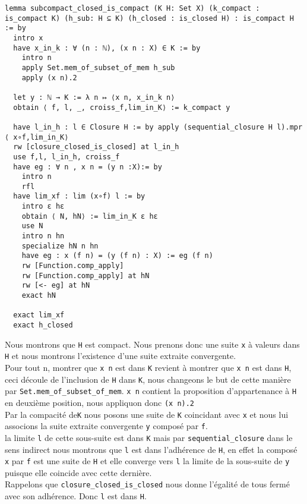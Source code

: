 \documentclass[a4paper, 12pt]{article}
\newcommand{\lean}[1]{\texttt{#1}}
\begin{document}
\begin{verbatim}
lemma subcompact_closed_is_compact (K H: Set X) (k_compact : is_compact K) (h_sub: H ⊆ K) (h_closed : is_closed H) : is_compact H := by
  intro x
  have x_in_k : ∀ (n : ℕ), (x n : X) ∈ K := by
    intro n
    apply Set.mem_of_subset_of_mem h_sub
    apply (x n).2

  let y : ℕ → K := λ n ↦ ⟨x n, x_in_k n⟩
  obtain ⟨ f, l, _, croiss_f,lim_in_K⟩ := k_compact y

  have l_in_h : l ∈ Closure H := by apply (sequential_closure H l).mpr ⟨ x∘f,lim_in_K⟩
  rw [closure_closed_is_closed] at l_in_h
  use f,l, l_in_h, croiss_f
  have eg : ∀ n , x n = (y n :X):= by
    intro n
    rfl
  have lim_xf : lim (x∘f) l := by
    intro ε hε
    obtain ⟨ N, hN⟩ := lim_in_K ε hε
    use N
    intro n hn
    specialize hN n hn
    have eg : x (f n) = (y (f n) : X) := eg (f n)
    rw [Function.comp_apply]
    rw [Function.comp_apply] at hN
    rw [<- eg] at hN
    exact hN

  exact lim_xf
  exact h_closed
\end{verbatim}

Nous montrons que \lean{H} est compact. Nous prenons donc une suite \lean{x} à valeurs dans \lean{H} et nous montrons l'existence d'une suite extraite convergente.\\

Pour tout n, montrer que \lean{x n} est dans \lean{K} revient à montrer que \lean{x n} est dans \lean{H}, ceci découle de l'inclusion de \lean{H} dans \lean{K}, nous changeons le but de cette manière par \lean{Set.mem_of_subset_of_mem}. \lean{x n} contient la proposition d'appartenance à \lean{H} en deuxième position, nous appliquon donc \lean{(x n).2}\\

Par la compacité de\lean{K} nous posons une suite de \lean{K} coincidant avec \lean{x} et nous lui associons la suite extraite convergente \lean{y} composé par \lean{f}.\\

la limite \lean{l} de cette sous-suite est dans \lean{K} mais par \lean{sequential_closure} dans le sens indirect nous montrons que \lean{l} est dans l'adhérence de \lean{H}, en effet la composé \lean{x} par \lean{f} est une suite de \lean{H} et elle converge vers \lean{l} la limite de la sous-suite de \lean{y} puisque elle coincide avec cette dernière.\\

Rappelons que \lean{closure_closed_is_closed} nous donne l'égalité de tous fermé avec son adhérence. Donc \lean{l} est dans \lean{H}.\\
\end{document}
